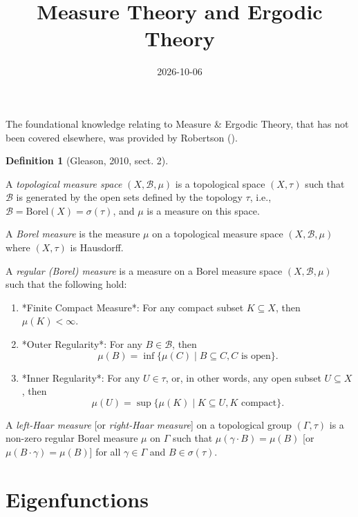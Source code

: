 \documentclass[
  british,
]{article}
\title{Measure Theory and Ergodic Theory}
\author{}
\date{2026-10-06}
\theoremstyle{plain}
\theoremstyle{plain}
\theoremstyle{definition}
\newtheorem{definition}{Definition}[section]
\theoremstyle{remark}
\newcommand{\Group}{{\Gamma}}
\newcommand{\GroupElement}{{\gamma}}
\newcommand{\GroupOperation}[2]{{#1}\cdot{#2}}
\newcommand{\Measure}{{\mu}}
\newcommand{\SigmaAlgebra}[1]{{\mathscr{#1}}}
\newcommand{\Topology}{{\tau}}
\newcommand{\SigmaAlgebraGenerator}[1][\Topology]{{\sigma({#1})}}
\begin{document}
\maketitle


The foundational knowledge relating to Measure \& Ergodic Theory, that
has not been covered elsewhere, was provided by Robertson
().

\begin{definition}[{Gleason, 2010, sect.
2}]\protect\hypertarget{def-TopoMeasureSpace}{}\label{def-TopoMeasureSpace}

A \emph{topological measure space} \((X,\SigmaAlgebra{B},\Measure)\) is
a topological space \((X,\Topology)\) such that \(\SigmaAlgebra{B}\) is
generated by the open sets defined by the topology \(\Topology\), i.e.,
\(\SigmaAlgebra{B}=\text{Borel}(X)=\SigmaAlgebraGenerator\), and
\(\Measure\) is a measure on this space.

A \emph{Borel measure} is the measure \(\Measure\) on a topological
measure space \((X,\SigmaAlgebra{B},\Measure)\) where \((X,\Topology)\)
is Hausdorff.

A \emph{regular (Borel) measure} is a measure on a Borel measure space
\((X,\SigmaAlgebra{B},\Measure)\) such that the following hold:

\begin{enumerate}
  \item *Finite Compact Measure*: For any compact subset $K\subseteq X$, then $\Measure(K)<\infty$.
  \item *Outer Regularity*: For any $B\in\SigmaAlgebra{B}$, then
  $$\Measure(B)=\inf\{\Measure(C)\mid B\subseteq C, C\text{ is open} \}. $$
  \item *Inner Regularity*: For any $U\in\Topology$, or, in other words, any open subset $U\subseteq X$, then
  $$\Measure(U)=\sup\{\Measure(K)\mid K\subseteq U, K\text{ compact} \}. $$
\end{enumerate}

A \emph{left-Haar measure} {[}or \emph{right-Haar measure}{]} on a
topological group \((\Group,\Topology)\) is a non-zero regular Borel
measure \(\Measure\) on \(\Group\) such that
\(\Measure(\GroupOperation{\GroupElement}{B})=\Measure(B)\) {[}or
\(\Measure(\GroupOperation{B}{\GroupElement})=\Measure(B)\){]} for all
\(\GroupElement\in\Group\) and \(B\in\sigma(\Topology)\).

\end{definition}

\section{Eigenfunctions}\label{eigenfunctions}
\end{document}
